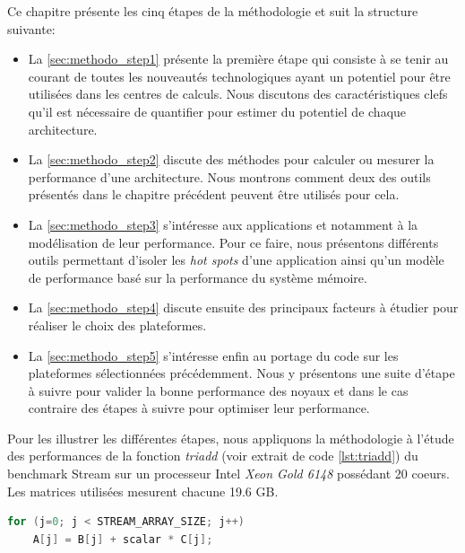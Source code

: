         Ce chapitre présente les cinq étapes de la méthodologie et suit la structure suivante:
        \begin{itemize}
            \item La \autoref{sec:methodo_step1} présente la première étape qui consiste à se tenir au courant de toutes les nouveautés technologiques ayant un potentiel pour être utilisées dans les centres de calculs. Nous discutons des caractéristiques clefs qu'il est nécessaire de quantifier pour estimer du potentiel de chaque architecture.
            \item La \autoref{sec:methodo_step2} discute des méthodes pour calculer ou mesurer la performance d'une architecture. Nous montrons comment deux des outils présentés dans le chapitre précédent peuvent être utilisés pour cela.
            \item La \autoref{sec:methodo_step3} s'intéresse aux applications et notamment à la modélisation de leur performance. Pour ce faire, nous présentons différents outils permettant d'isoler les \textit{hot spots} d'une application ainsi qu'un modèle de performance basé sur la performance du système mémoire.
            \item La \autoref{sec:methodo_step4} discute ensuite des principaux facteurs à étudier pour réaliser le choix des plateformes. 
            \item La \autoref{sec:methodo_step5} s'intéresse enfin au portage du code sur les plateformes sélectionnées précédemment. Nous y présentons une suite d'étape à suivre pour valider la bonne performance des noyaux et dans le cas contraire des étapes à suivre pour optimiser leur performance.
        \end{itemize}
        
        Pour les illustrer les différentes étapes, nous appliquons la méthodologie à l'étude des performances de la fonction \textit{triadd} (voir extrait de code \ref{lst:triadd}) du benchmark Stream \cite{McCalpin1995} sur un processeur Intel\textit{ Xeon Gold 6148} possédant 20 coeurs. Les matrices utilisées mesurent chacune 19.6 GB. 
        
\begin{lstlisting}[language=c,caption=Fonction Triadd extraite du benchmark Stream \ref{McCalpin1995},label={lst:triadd}, 
  basicstyle=\footnotesize, frame=tb,
  xleftmargin=.065\textwidth, xrightmargin=.065\textwidth]
for (j=0; j < STREAM_ARRAY_SIZE; j++)
    A[j] = B[j] + scalar * C[j];
\end{lstlisting}
